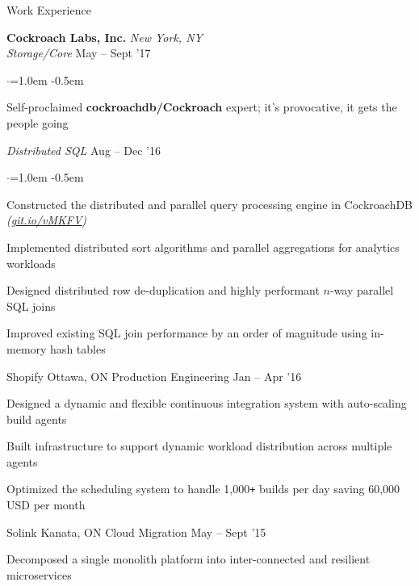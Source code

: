 \documentclass{resume} %
\begin{document}
\begin{rSection}{Work Experience}


  {\bf Cockroach Labs, Inc.}  \hfill  {\em New York, NY}
  \\
  {\em Storage/Core}  \hfill  {May -- Sept '17}
  \smallskip
  \begin{list}{$\cdot$}{\leftmargin=1.0em}
  \itemsep -0.5em \vspace{-0.5em}
  \item Self-proclaimed \textbf {cockroachdb/Cockroach} expert; it's provocative, it gets the people going
  \end{list}
  {\em Distributed SQL}  \hfill  {Aug -- Dec '16}
  \smallskip
  \begin{list}{$\cdot$}{\leftmargin=1.0em}
  \itemsep -0.5em \vspace{-0.5em}
    \item Constructed the distributed and parallel query processing engine in
      CockroachDB {\em (\href{https://git.io/vMKFV}{git.io/vMKFV})}
    \item Implemented distributed sort algorithms and parallel aggregations for
      analytics workloads
    \item Designed distributed row de-duplication and highly performant $n$-way
      parallel SQL joins
    \item Improved existing SQL join performance by an order of magnitude using
      in-memory hash tables
  \end{list}
  \vspace{0.5em}

  \begin{rSubsection}{Shopify}
                     {Ottawa, ON}
                     {Production Engineering}
                     {Jan -- Apr '16}

  \item Designed a dynamic and flexible continuous integration system with
    auto-scaling build agents
  \item Built infrastructure to support dynamic workload distribution across
    multiple agents
  \item Optimized the scheduling system to handle 1,000\texttt{+} builds per
    day saving 60,000 USD per month
  \end{rSubsection}

  \begin{rSubsection}{Solink}
                     {Kanata, ON}
                     {Cloud Migration}
                     {May -- Sept '15}

    \item Decomposed a single monolith platform into inter-connected and
      resilient microservices
  \end{rSubsection}
\end{rSection}
\end{document}
